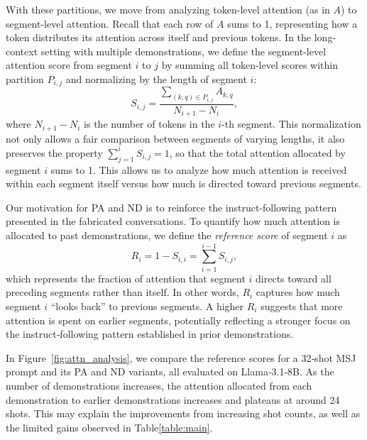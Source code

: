 With these partitions, we move from analyzing token-level attention (as in $A$) to segment-level attention. Recall that each row of $A$ sums to 1, representing how a token distributes its attention across itself and previous tokens. In the long-context setting with multiple demonstrations, we define the segment-level attention score from segment $i$ to $j$ by summing all token-level scores within partition $P_{i,j}$ and normalizing by the length of segment $i$:
\begin{equation}
    S_{i,j} = \frac{\sum_{(k,q)\in{P_{i,j}}} A_{k,q}}{N_{i+1} - N_{i}},
\end{equation}
where $N_{i+1} - N_{i}$ is the number of tokens in the $i$-th segment. This normalization not only allows a fair comparison between segments of varying lengths, it also preserves the property
$
    \sum_{j=1}^{i} S_{i,j} = 1
$,
so that the total attention allocated by segment $i$ sums to 1. This allows us to analyze how much attention is received within each segment itself versus how much is directed toward previous segments.


Our motivation for PA and ND is to reinforce the instruct-following pattern presented in the fabricated conversations. To quantify how much attention is allocated to past demonstrations, we define the \textit{reference score} of segment $i$ as
\begin{equation}
    R_i = 1-S_{i,i} = \sum_{i=1}^{i-1} S_{i,j},
\end{equation}
which represents the fraction of attention that segment $i$ directs toward all preceding segments rather than itself. In other words, $R_i$ captures how much segment $i$ ``looks back'' to previous segments. A higher $R_i$ suggests that more attention is spent on earlier segments, potentially reflecting a stronger focus on the instruct‐following pattern established in prior demonstrations. 


In Figure~\ref{fig:attn_analysis}, we compare the reference scores for a 32‐shot MSJ prompt and its PA and ND variants, all evaluated on Llama‐3.1‐8B. As the number of demonstrations increases, the attention allocated from each demonstration to earlier demonstrations increases and plateaus at around 24 shots. This may explain the improvements from increasing shot counts, as well as the limited gains observed in Table\ref{table:main}.


